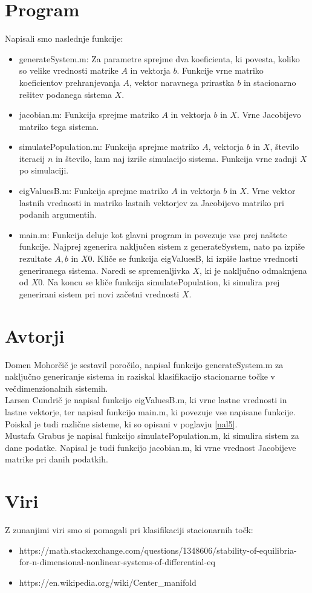 \documentclass[a4paper, 12pt]{article}
\begin{document}
\section{Program}
Napisali smo naslednje funkcije:
\begin{itemize}
	\item {\sf generateSystem.m}: Za parametre sprejme dva koeficienta, ki povesta, koliko so velike vrednosti matrike
		$ A $ in vektorja $ b $. Funkcije vrne matriko koeficientov prehranjevanja $ A $, vektor naravnega prirastka $ b $ in
		stacionarno rešitev podanega sistema $ X $.
	\item {\sf jacobian.m}: Funkcija sprejme matriko $ A $ in vektorja $ b $ in $ X $. Vrne Jacobijevo matriko tega sistema.
	\item {\sf simulatePopulation.m}: Funkcija sprejme matriko $ A $, vektorja $ b $ in $ X $, število iteracij $ n $ in število,
		kam naj izriše simulacijo sistema. Funkcija vrne zadnji $ X $ po simulaciji.
	\item {\sf eigValuesB.m}: Funkcija sprejme matriko $ A $ in vektorja $ b $ in $ X $. Vrne vektor lastnih vrednosti in matriko
		lastnih vektorjev za Jacobijevo matriko pri podanih argumentih.
	\item {\sf main.m}: Funkcija deluje kot glavni program in povezuje vse prej naštete funkcije. Najprej zgenerira naključen sistem z
		{\sf generateSystem}, nato pa izpiše rezultate $ A, b $ in $ X0 $. Kliče se funkcija {\sf eigValuesB}, ki izpiše lastne vrednosti
		generiranega sistema. Naredi se spremenljivka $ X $, ki je naključno odmaknjena od $ X0 $. Na koncu se kliče funkcija {\sf simulatePopulation},
		ki simulira prej generirani sistem pri novi začetni vrednosti $ X $.
\end{itemize}

\section{Avtorji}
Domen Mohorčič je sestavil poročilo, napisal funkcijo {\sf generateSystem.m} za naključno generiranje sistema
in raziskal klasifikacijo stacionarne točke v večdimenzionalnih sistemih.\\
Larsen Cundrič je napisal funkcijo {\sf eigValuesB.m}, ki vrne lastne vrednosti in lastne vektorje,
ter napisal funkcijo {\sf main.m}, ki povezuje vse napisane funkcije.
Poiskal je tudi različne sisteme, ki so opisani v poglavju \ref{nal5}.\\
Mustafa Grabus je napisal funkcijo {\sf simulatePopulation.m}, ki simulira sistem za dane podatke.
Napisal je tudi funkcijo {\sf jacobian.m}, ki vrne vrednost Jacobijeve matrike pri danih podatkih.

\section{Viri}
Z zunanjimi viri smo si pomagali pri klasifikaciji stacionarnih točk:
\begin{itemize}
	\item https://math.stackexchange.com/questions/1348606/stability-of-equilibria-for-n-dimensional-nonlinear-systems-of-differential-eq
	\item https://en.wikipedia.org/wiki/Center\_manifold
\end{itemize}
\end{document}
